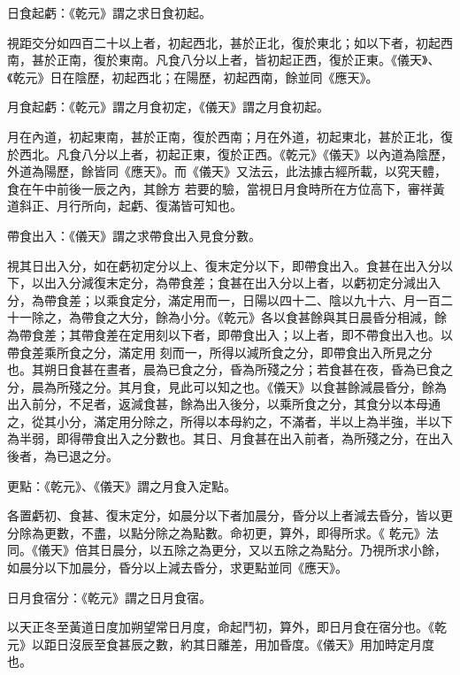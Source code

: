 \begin{pinyinscope}
 日食起虧：《乾元》謂之求日食初起。



 視距交分如四百二十以上者，初起西北，甚於正北，復於東北；如以下者，初起西南，甚於正南，復於東南。凡食八分以上者，皆初起正西，復於正東。《儀天》、《乾元》日在陰歷，初起西北；在陽歷，初起西南，餘並同《應天》。



 月食起虧：《乾元》謂之月食初定，《儀天》謂之月食初起。



 月在內道，初起東南，甚於正南，復於西南；月在外道，初起東北，甚於正北，復於西北。凡食八分以上者，初起正東，復於正西。《乾元》《儀天》以內道為陰歷，外道為陽歷，餘皆同《應天》。而《儀天》又法云，此法據古經所載，以究天體，食在午中前後一辰之內，其餘方
 若要的驗，當視日月食時所在方位高下，審祥黃道斜正、月行所向，起虧、復滿皆可知也。



 帶食出入：《儀天》謂之求帶食出入見食分數。



 視其日出入分，如在虧初定分以上、復末定分以下，即帶食出入。食甚在出入分以下，以出入分減復末定分，為帶食差；食甚在出入分以上者，以虧初定分減出入分，為帶食差；以乘食定分，滿定用而一，日陽以四十二、陰以九十六、月一百二十一除之，為帶食之大分，餘為小分。《乾元》各以食甚餘與其日晨昏分相減，餘為帶食差；其帶食差在定用刻以下者，即帶食出入；以上者，即不帶食出入也。以帶食差乘所食之分，滿定用
 刻而一，所得以減所食之分，即帶食出入所見之分也。其朔日食甚在晝者，晨為已食之分，昏為所殘之分；若食甚在夜，昏為已食之分，晨為所殘之分。其月食，見此可以知之也。《儀天》以食甚餘減晨昏分，餘為出入前分，不足者，返減食甚，餘為出入後分，以乘所食之分，其食分以本母通之，從其小分，滿定用分除之，所得以本母約之，不滿者，半以上為半強，半以下為半弱，即得帶食出入之分數也。其日、月食甚在出入前者，為所殘之分，在出入後者，為已退之分。



 更點：《乾元》、《儀天》謂之月食入定點。



 各置虧初、食甚、復末定分，如晨分以下者加晨分，昏分以上者減去昏分，皆以更分除為更數，不盡，以點分除之為點數。命初更，算外，即得所求。《
 乾元》法同。《儀天》倍其日晨分，以五除之為更分，又以五除之為點分。乃視所求小餘，如晨分以下加晨分，昏分以上減去昏分，求更點並同《應天》。



 日月食宿分：《乾元》謂之日月食宿。



 以天正冬至黃道日度加朔望常日月度，命起鬥初，算外，即日月食在宿分也。《乾元》以距日沒辰至食甚辰之數，約其日離差，用加昏度。《儀天》用加時定月度也。



\end{pinyinscope}